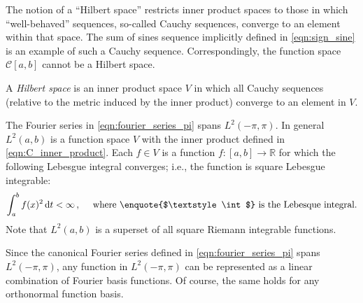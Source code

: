 The notion of a \enquote{Hilbert space} restricts inner product spaces to those in which \enquote{well-behaved} sequences, so-called Cauchy sequences, converge to an element within that space.
The sum of sines sequence implicitly defined in \cref{eqn:sign_sine} is an example of such a Cauchy sequence.
Correspondingly, the function space $\mathcal{C}[a, b]$ cannot be a Hilbert space.

\begin{definition}
 	A \emph{Hilbert space} is an inner product space $V$ in which all Cauchy sequences (relative to the metric induced by the inner product) converge to an element in $V$.
\end{definition}

\begin{example}
The Fourier series in \cref{eqn:fourier_series_pi} spans $L^2(-\pi, \pi)$. In general $L^2(a, b)$ is a function space $V$ with the inner product defined in \cref{eqn:C_inner_product}. Each $f \in V$ is a function $f : [a, b] \longrightarrow \mathbb{R}$ for which the following Lebesgue integral converges; i.e., the function is square Lebesgue integrable:
\begin{align*}
   	\int_{a}^b f(x)^2 \,\mathrm{d}t < \infty \,, \quad \text{ where \enquote{$\textstyle\int$} is the Lebesque integral.}
\end{align*}
Note that $L^2(a, b)$ is a superset of all square Riemann integrable functions.
\end{example}

Since the canonical Fourier series defined in \cref{eqn:fourier_series_pi} spans $L^2(-\pi, \pi)$, any function in $L^2(-\pi, \pi)$ can be represented as a linear combination of Fourier basis functions.
Of course, the same holds for any orthonormal function basis.